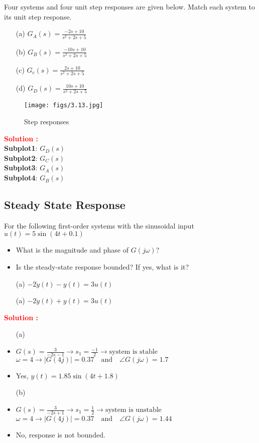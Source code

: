\documentclass[12pt]{article}
\begin{document}
Four systems and four unit step responses are given below. Match each system to its unit step response.
\begin{itemize}
    \item[(a)] \(G_A(s) = \frac{-2s+10}{s^2+2s+5}\)
    \item[(b)] \(G_B(s) = \frac{-10s+10}{s^2+2s+5}\)
    \item[(c)] \(G_c(s) = \frac{2s+10}{s^2+2s+5} \)
    \item[(d)] \(G_D(s) = \frac{10s+10}{s^2+2s+5}\)
\end{itemize}
\begin{figure}[h]
\centering
\texttt{[image: figs/3.13.jpg]}
\caption{Step responses}
\end{figure}
\textbf{\textcolor{red}{Solution :}} \\
\textbf{Subplot1}: \(G_D(s)\) \\
\textbf{Subplot2}: \(G_C(s)\) \\
\textbf{Subplot3}: \(G_A(s)\) \\
\textbf{Subplot4}: \(G_B(s)\) \\

\clearpage
\subsection{Steady State Response}

For the following first-order systems with the sinusoidal input \(u(t) = 5 \sin(4t+0.1)\)
\begin{itemize}
    \item What is the magnitude and phase of \(G(j\omega)\)?
    \item Is the steady-state response bounded? If yes, what is it?
    \item[(a)] \(-2\dot{y}(t) - y(t) = 3 u(t)\)
        \item[(a)] \(-2\dot{y}(t) + y(t) = 3 u(t)\)
\end{itemize}
\textbf{\textcolor{red}{Solution :}}
\begin{itemize}
    \item[(a)] 
    \item \(G(s) = \frac{3}{-2s-1} \rightarrow s_1 = \frac{-1}{2} \rightarrow \text{system is stable}\) \\ \(\omega = 4 \rightarrow |G(4j)| = 0.37 \quad \text{and} \quad \angle G(j\omega) = 1.7 \)
    \item Yes, \(y(t) = 1.85 \sin(4t+1.8)\)
    \item[(b)]
    \item \(G(s) = \frac{3}{-2s+1} \rightarrow s_1 = \frac{1}{2} \rightarrow \text{system is unstable}\) \\ \(\omega = 4 \rightarrow |G(4j)| = 0.37 \quad \text{and} \quad \angle G(j\omega) = 1.44 \)
    \item No, response is not bounded.
\end{itemize}
\end{document}
